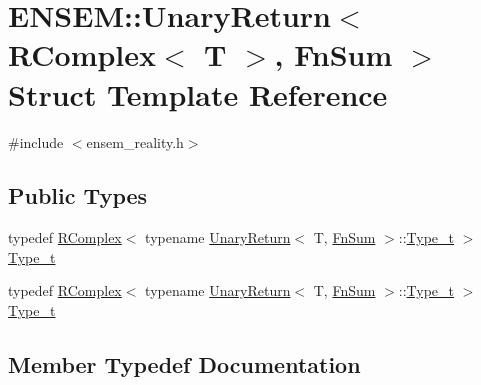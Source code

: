 \hypertarget{structENSEM_1_1UnaryReturn_3_01RComplex_3_01T_01_4_00_01FnSum_01_4}{}\section{E\+N\+S\+EM\+:\+:Unary\+Return$<$ R\+Complex$<$ T $>$, Fn\+Sum $>$ Struct Template Reference}
\label{structENSEM_1_1UnaryReturn_3_01RComplex_3_01T_01_4_00_01FnSum_01_4}


{\ttfamily \#include $<$ensem\+\_\+reality.\+h$>$}

\subsection*{Public Types}
\begin{DoxyCompactItemize}
\item 
typedef \mbox{\hyperlink{classENSEM_1_1RComplex}{R\+Complex}}$<$ typename \mbox{\hyperlink{structENSEM_1_1UnaryReturn}{Unary\+Return}}$<$ T, \mbox{\hyperlink{structENSEM_1_1FnSum}{Fn\+Sum}} $>$\+::\mbox{\hyperlink{structENSEM_1_1UnaryReturn_3_01RComplex_3_01T_01_4_00_01FnSum_01_4_a466a9eef64139dc94681a73722d48328}{Type\+\_\+t}} $>$ \mbox{\hyperlink{structENSEM_1_1UnaryReturn_3_01RComplex_3_01T_01_4_00_01FnSum_01_4_a466a9eef64139dc94681a73722d48328}{Type\+\_\+t}}
\item 
typedef \mbox{\hyperlink{classENSEM_1_1RComplex}{R\+Complex}}$<$ typename \mbox{\hyperlink{structENSEM_1_1UnaryReturn}{Unary\+Return}}$<$ T, \mbox{\hyperlink{structENSEM_1_1FnSum}{Fn\+Sum}} $>$\+::\mbox{\hyperlink{structENSEM_1_1UnaryReturn_3_01RComplex_3_01T_01_4_00_01FnSum_01_4_a466a9eef64139dc94681a73722d48328}{Type\+\_\+t}} $>$ \mbox{\hyperlink{structENSEM_1_1UnaryReturn_3_01RComplex_3_01T_01_4_00_01FnSum_01_4_a466a9eef64139dc94681a73722d48328}{Type\+\_\+t}}
\end{DoxyCompactItemize}


\subsection{Member Typedef Documentation}
\mbox{\label{structENSEM_1_1UnaryReturn_3_01RComplex_3_01T_01_4_00_01FnSum_01_4_a466a9eef64139dc94681a73722d48328}} 
